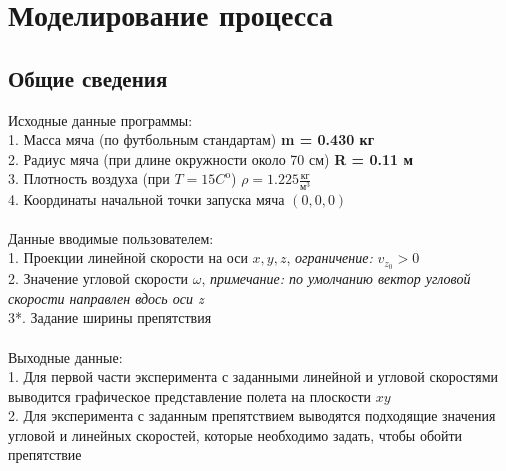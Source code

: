\documentclass[a5paper, 10pt]{article}
\theoremstyle{definition}
\theoremstyle{plain}
\theoremstyle{remark}
\begin{document}
\section{Моделирование процесса}
\subsection{Общие сведения}
Исходные данные программы:\\
1. Масса мяча (по футбольным стандартам) \textbf{m = 0.430 кг}\\
2. Радиус мяча (при длине окружности около 70 см)  \textbf{R = 0.11 м}\\
3. Плотность воздуха (при $T = 15 C^{\text{o}}$) $\rho = 1.225 \frac{\text{кг}}{\text{м}^3}$\\
4. Координаты начальной точки запуска мяча $(0, 0, 0)$\\\\
Данные вводимые пользователем:\\
1. Проекции линейной скорости на оси $x, y, z$, \textit{ограничение: }  $v_{z_{0}} > 0$\\
2. Значение угловой скорости $\omega$, \textit{ примечание: по умолчанию вектор угловой скорости направлен вдось оси z }\\
3*. Задание ширины препятствия\\\\
Выходные данные:\\
1. Для первой части эксперимента с заданными линейной и угловой скоростями выводится графическое представление полета на плоскости $xy$\\
2. Для эксперимента с заданным препятствием выводятся подходящие значения угловой и линейных скоростей, которые необходимо задать, чтобы обойти препятствие\\
\end{document}

